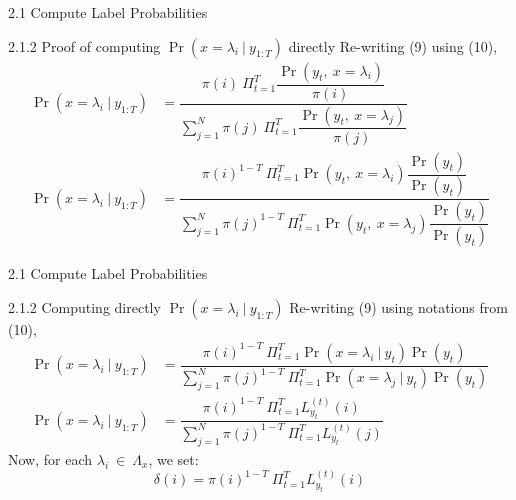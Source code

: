 \documentclass{beamer}
\providecommand{\pr}[1]{\ensuremath{\Pr\left(#1\right)}}
\begin{document}
\begin{frame}{2.1 Compute Label Probabilities}
\begin{block}{2.1.2 Proof of computing $\pr{x = \lambda_i\ |\ y_{1:T}}$ directly}
    Re-writing (9) using (10),
    \begin{equation}
        \begin{split}
            \pr{x=\lambda_i\ |\ y_{1:T}} &= \dfrac{\pi(i)\ \Pi_{t=1}^{T}\dfrac{\pr{y_t,\ x=\lambda_i}}{\pi(i)}}{\sum_{j=1}^{N}\pi(j)\ \Pi_{t=1}^{T}\dfrac{\pr{y_t,\ x=\lambda_j}}{\pi(j)}}\\
            \pr{x=\lambda_i\ |\ y_{1:T}} &= \dfrac{\pi(i)^{1-T}\ \Pi_{t=1}^{T}\pr{y_t,\ x=\lambda_i}\dfrac{\pr{y_t}}{\pr{y_t}}}{\sum_{j=1}^{N}\pi(j)^{1-T}\ \Pi_{t=1}^{T}\pr{y_t,\ x=\lambda_j}\dfrac{\pr{y_t}}{\pr{y_t}}}
        \end{split}
    \end{equation}
\end{block}
\end{frame}
\begin{frame}{2.1 Compute Label Probabilities}
\begin{block}{2.1.2 Computing directly $\pr{x = \lambda_i\ |\ y_{1:T}}$}
    Re-writing (9) using notations from (10),
    \begin{equation}
        \begin{split}
            \pr{x=\lambda_i\ |\ y_{1:T}} &= \dfrac{\pi(i)^{1-T}\ \Pi_{t=1}^{T}\pr{x = \lambda_i\ |\ y_t}\pr{y_t}}{\sum_{j=1}^{N}\pi(j)^{1-T}\ \Pi_{t=1}^{T}\pr{x = \lambda_j\ |\ y_t}\pr{y_t}}\\
            \pr{x=\lambda_i\ |\ y_{1:T}} &= \dfrac{\pi(i)^{1-T}\ \Pi_{t=1}^{T}L_{y_t}^{(t)}(i)}{\sum_{j=1}^{N}\pi(j)^{1-T}\ \Pi_{t=1}^{T}L_{y_t}^{(t)}(j)}
        \end{split}
    \end{equation}
    Now, for each $\lambda_i\ \in\ \Lambda_x$, we set:
    \begin{equation}
        \delta(i) = \pi(i)^{1-T}\ \Pi_{t=1}^{T}L_{y_t}^{(t)}(i)
    \end{equation}
\end{block}
\end{frame}
\end{document}
